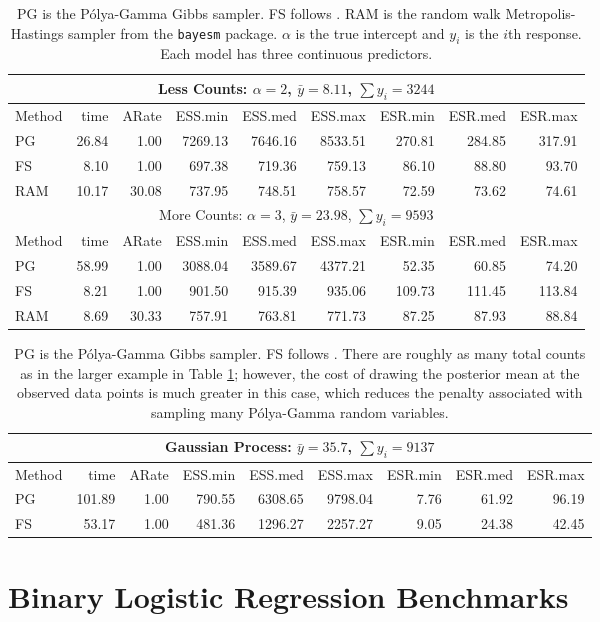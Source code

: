 \documentclass{article}
\newcommand{\Polya}{P\'{o}lya}
\begin{document}
\begin{table}
\label{tab:nb-synth}
\begin{tabular}{l r r r r r r r r }
\hline 
\multicolumn{9}{c}{Less Counts: $\alpha = 2$, $\bar y = 8.11$, $\sum y_i = 3244$} \\
\hline
Method  &     time &    ARate &  ESS.min &  ESS.med &  ESS.max &  ESR.min &  ESR.med &  ESR.max \\ 
    PG  &    26.84 &     1.00 &  7269.13 &  7646.16 &  8533.51 &   270.81 &   284.85 &   317.91 \\ 
    FS  &     8.10 &     1.00 &   697.38 &   719.36 &   759.13 &    86.10 &    88.80 &    93.70 \\ 
   RAM  &    10.17 &    30.08 &   737.95 &   748.51 &   758.57 &    72.59 &    73.62 &    74.61 \\
\hline
\multicolumn{9}{c}{More Counts: $\alpha = 3$, $\bar y = 23.98$, $\sum y_i = 9593$} \\
\hline
Method  &     time &    ARate &  ESS.min &  ESS.med &  ESS.max &  ESR.min &  ESR.med &  ESR.max \\ 
    PG  &    58.99 &     1.00 &  3088.04 &  3589.67 &  4377.21 &    52.35 &    60.85 &    74.20 \\ 
    FS  &     8.21 &     1.00 &   901.50 &   915.39 &   935.06 &   109.73 &   111.45 &   113.84 \\ 
   RAM  &     8.69 &    30.33 &   757.91 &   763.81 &   771.73 &    87.25 &    87.93 &    88.84
 \end{tabular}
 \caption{
   PG is the \Polya-Gamma Gibbs sampler.  FS follows
   \cite{fruhwirth-schnatter-etal-2009}.  RAM is the random walk
   Metropolis-Hastings sampler from the \texttt{bayesm} package. 
   $\alpha$ is the true intercept and $y_i$ is the $i$th response.  Each model
   has three continuous predictors.
 }
\end{table}

\begin{table}
\label{tab:nb-gp}
\begin{tabular}{l r r r r r r r r } 
\multicolumn{9}{c}{Gaussian Process: $\bar y = 35.7$, $\sum y_i = 9137$} \\
\hline
Method  &     time &    ARate &  ESS.min &  ESS.med &  ESS.max &  ESR.min &  ESR.med &  ESR.max \\ 
    PG  &   101.89 &     1.00 &   790.55 &  6308.65 &  9798.04 &     7.76 &    61.92 &    96.19 \\ 
    FS  &    53.17 &     1.00 &   481.36 &  1296.27 &  2257.27 &     9.05 &    24.38 &    42.45
 \end{tabular}
 \caption{PG is the \Polya-Gamma Gibbs sampler.  FS follows
   \cite{fruhwirth-schnatter-etal-2009}.  There are roughly as many total counts
   as in the larger example in Table \ref{tab:nb-synth}; however, the cost of
   drawing the posterior mean at the observed data points is much greater in
   this case, which reduces the penalty associated with sampling many
   \Polya-Gamma random variables.}
\end{table}

\appendix

\section{Binary Logistic Regression Benchmarks}
\label{sec:blogit-benchmarks}




{}
\end{document}
